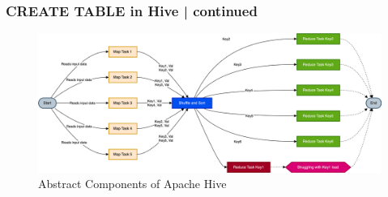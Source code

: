 		\begin{frame}
			\frametitle{CREATE TABLE in Hive | continued}  
			\vspace{-0.5cm}		
			\begin{tcolorbox}[colback=white,colframe=black,title= Part 10: Data Skewing]					
				\begin{figure}
					\includegraphics[width=\textwidth,height=.7\textheight,keepaspectratio]{./Figures/chapter-03/dwh_hive-skweed_dt_mr.png}	
					\caption{Abstract Components of Apache Hive}
				\end{figure}
			\end{tcolorbox}
		\end{frame}	
		
